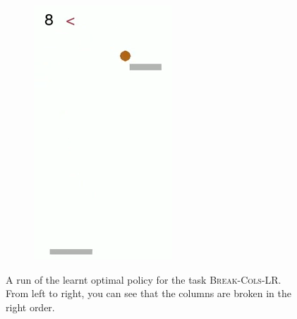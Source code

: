 \begin{figure}[h]
\begin{subfigure}[b]{0.23\textwidth}
		\includegraphics[width=\textwidth]{images/breakout-33-lr-3.png}
	\end{subfigure}
	\caption{A run of the learnt optimal policy for the task \textsc{Break-Cols-LR}. From left to right, you can see that the columns are broken in the right order.}\label{exa:breakout-33-lr}
\end{figure}

